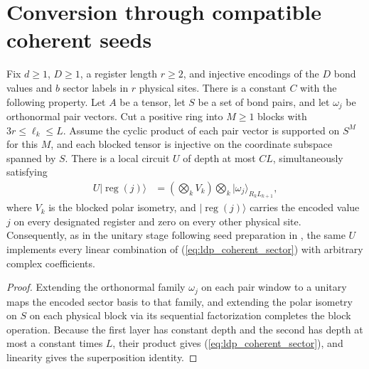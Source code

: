 \section{Conversion through compatible coherent seeds}

\begin{lemma}
    \label{thm:ldp_coherent_sector_circuit}
    \leanok
    Fix $d\geq1$, $D\geq1$, a register length $r\geq2$, and injective
    encodings of the $D$ bond values and $b$ sector labels in $r$ physical
    sites. There is a constant $C$ with the following property. Let $A$ be
    a tensor, let $S$ be a set of bond pairs, and let $\omega_j$ be
    orthonormal pair vectors. Cut a positive ring into $M\ge1$ blocks with
    $3r\leq\ell_k\leq L$. Assume the cyclic product of each pair vector
    is supported on $S^M$ for this $M$, and each blocked tensor is injective on the
    coordinate subspace spanned by $S$. There is a local circuit $U$ of
    depth at most $CL$, simultaneously satisfying
    \begin{align}
        U|\operatorname{reg}(j)\rangle
         & =\left(\bigotimes_k V_k\right)
        \bigotimes_k|\omega_j\rangle_{R_kL_{k+1}},
        \label{eq:ldp_coherent_sector}
    \end{align}
    where $V_k$ is the blocked polar isometry, and
    $|\operatorname{reg}(j)\rangle$ carries the encoded value $j$ on every
    designated register and zero on every other physical site.
    Consequently, as in the unitary stage following seed preparation in
    \cite[Long-range MPS using measurements]{Malz2024Preparation}, the same $U$ implements every linear combination of
    (\ref{eq:ldp_coherent_sector}) with arbitrary complex coefficients.
\end{lemma}
\begin{proof}
    \leanok
    Extending the orthonormal family $\omega_j$ on each pair window to a
    unitary maps the encoded sector basis to that family, and extending
    the polar isometry on $S$ on each physical block via its sequential
    factorization completes the block operation. Because the first layer has constant depth and the second has
    depth at most a constant times $L$, their product gives
    (\ref{eq:ldp_coherent_sector}), and linearity gives the superposition identity.
\end{proof}

